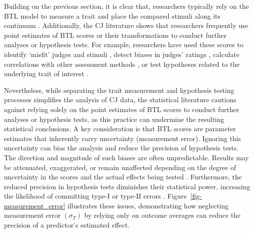 \documentclass[
  authoryear,
  review,
  1p]{elsarticle}
\begin{document}
Building on the previous section, it is clear that, researchers
typically rely on the BTL model to measure a trait and place the
compared stimuli along its continuum \citep[pp.~269]{Thurstone_1927b}.
Additionally, the CJ literature shows that researchers frequently use
point estimates of BTL scores or their transformations to conduct
further analyses or hypothesis tests. For example, researchers have used
these scores to identify `misfit' judges and stimuli
\citep{Pollitt_2012b, vanDaal_et_al_2016, Goossens_et_al_2018}, detect
biases in judges' ratings \citep{Pollitt_et_al_2003, Pollitt_2012b},
calculate correlations with other assessment methods
\citep{Goossens_et_al_2018, Bouwer_et_al_2023}, or test hypotheses
related to the underlying trait of interest
\citep{Casalicchio_et_al_2015, Bramley_et_al_2019, Boonen_et_al_2020, Bouwer_et_al_2023, vanDaal_et_al_2017, Jones_et_al_2019, Gijsen_et_al_2021}.

Nevertheless, while separating the trait measurement and hypothesis
testing processes simplifies the analysis of CJ data, the statistical
literature cautions against relying solely on the point estimates of BTL
scores to conduct further analyses or hypothesis tests, as this practice
can undermine the resulting statistical conclusions. A key consideration
is that BTL scores are parameter estimates that inherently carry
uncertainty (measurement error). Ignoring this uncertainty can bias the
analysis and reduce the precision of hypothesis tests. The direction and
magnitude of such biases are often unpredictable. Results may be
attenuated, exaggerated, or remain unaffected depending on the degree of
uncertainty in the scores and the actual effects being tested
\citetext{\citealp[pp.~25]{Kline_et_al_2023}; \citealp[pp.~137]{Hoyle_et_al_2023}}.
Furthermore, the reduced precision in hypothesis tests diminishes their
statistical power, increasing the likelihood of committing type-I or
type-II errors \citep{McElreath_2020}.
Figure~\ref{fig-measurement_error} illustrates these issues,
demonstrating how neglecting measurement error \((\sigma_{T})\) by
relying only on outcome averages can reduce the precision of a
predictor's estimated effect.
\end{document}
